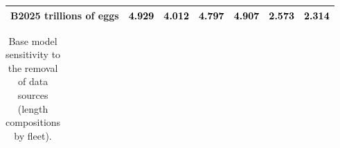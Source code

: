 \documentclass[
]{scrartcl}
\begin{document}
\begin{landscape}
\begin{longtable}[t]{ll>{\raggedright\arraybackslash}p{5em}>{\raggedright\arraybackslash}p{5em}>{\raggedright\arraybackslash}p{5em}>{\raggedright\arraybackslash}p{5em}>{\raggedright\arraybackslash}p{5em}}
\hspace{1em}B2025 trillions of eggs & \textcolor{black}{4.929} & \textcolor{black}{4.012} & \textcolor{black}{4.797} & \textcolor{black}{4.907} & \textcolor{black}{2.573} & \textcolor{black}{2.314}\\
\bottomrule

\end{longtable}

\endgroup{}


\end{landscape}

\newpage{}

\begin{landscape}
\begingroup\fontsize{9}{11}\selectfont

\begin{longtable}[t]{ll>{\raggedright\arraybackslash}p{4em}>{\raggedright\arraybackslash}p{4em}>{\raggedright\arraybackslash}p{4em}>{\raggedright\arraybackslash}p{4em}>{\raggedright\arraybackslash}p{4em}>{\raggedright\arraybackslash}p{4em}>{\raggedright\arraybackslash}p{4em}>{\raggedright\arraybackslash}p{4em}}

\caption{\label{tbl-sensitivities-like-lens1}Base model sensitivity to
the removal of data sources (length compositions by fleet).}

\tabularnewline


\end{longtable}
\end{landscape}
\end{document}
